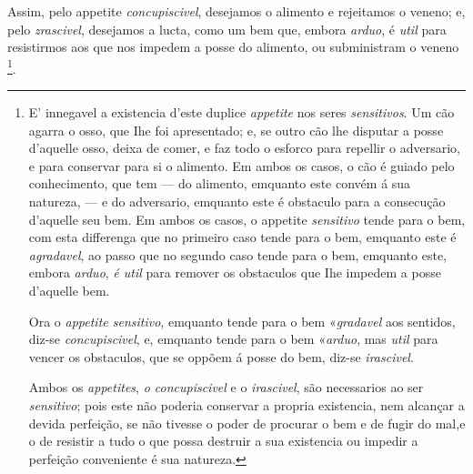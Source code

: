 Assim, pelo appetite \emph{concupiscivel}, desejamos o alimento e rejeitamos o veneno; e, pelo \emph{zrascivel}, desejamos a lucta, como um bem que, embora \emph{arduo}, é \emph{util} para resistirmos aos que nos impedem a posse do alimento, ou subministram o veneno \footnote{E' innegavel a existencia d'este duplice \emph{appetite} nos seres \emph{sensitivos}. Um cão agarra o osso, que Ihe foi apresentado; e, se outro cão lhe disputar a posse d'aquelle osso, deixa de comer, e faz todo o esforco para repellir o adversario, e para conservar para si o alimento. Em ambos os casos, o cão é guiado pelo conhecimento, que tem --- do alimento, emquanto este convém á sua natureza, --- e do adversario, emquanto este é obstaculo para a consecução d'aquelle seu bem. Em ambos os casos, o appetite \emph{sensitivo} tende para o bem, com esta differenga que no primeiro caso tende para o bem, emquanto este é \emph{agradavel}, ao passo que no segundo caso tende para o bem, emquanto este, embora \emph{arduo}, \emph{é util} para remover os obstaculos que Ihe impedem a posse d'aquelle bem.\par Ora o \emph{appetite sensitivo}, emquanto tende para o bem «\emph{gradavel} aos sentidos, diz-se \emph{concupiscivel}, e, emquanto tende para o bem «\emph{arduo}, mas \emph{util} para vencer os obstaculos, que se oppõem á posse do bem, diz-se \emph{irascivel}.\par Ambos os \emph{appetites}, \emph{o concupiscivel} e o \emph{irascivel}, são necessarios ao ser \emph{sensitivo}; pois este não poderia conservar a propria existencia, nem alcançar a devida perfeição, se não tivesse o poder de procurar o bem e de fugir do mal,e o de resistir a tudo o que possa destruir a sua existencia ou impedir a perfeição conveniente é sua natureza.}.


